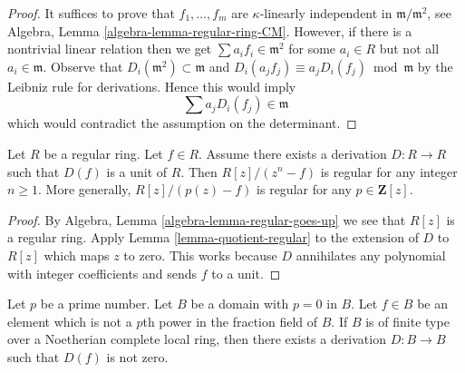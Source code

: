 \begin{proof}
It suffices to prove that $f_1, \ldots, f_m$ are $\kappa$-linearly
independent in $\mathfrak m/\mathfrak m^2$, see
Algebra, Lemma \ref{algebra-lemma-regular-ring-CM}.
However, if there is a nontrivial linear relation then we get
$\sum a_i f_i \in \mathfrak m^2$ for some $a_i \in R$
but not all $a_i \in \mathfrak m$. Observe that
$D_i(\mathfrak m^2) \subset \mathfrak m$ and
$D_i(a_j f_j) \equiv a_j D_i(f_j) \bmod \mathfrak m$
by the Leibniz rule for derivations. Hence
this would imply
$$
\sum a_j D_i(f_j) \in \mathfrak m
$$
which would contradict the assumption on the determinant.
\end{proof}

\begin{lemma}
\label{lemma-degree-p-extension-regular}
Let $R$ be a regular ring. Let $f \in R$.
Assume there exists a derivation $D : R \to R$ such that $D(f)$ is a unit
of $R$. Then $R[z]/(z^n - f)$ is regular for any integer $n \geq 1$.
More generally, $R[z]/(p(z) - f)$ is regular for any $p \in \mathbf{Z}[z]$.
\end{lemma}

\begin{proof}
By Algebra, Lemma \ref{algebra-lemma-regular-goes-up} we see that
$R[z]$ is a regular ring. Apply Lemma \ref{lemma-quotient-regular}
to the extension of $D$ to $R[z]$ which maps $z$ to zero.
This works because $D$ annihilates any polynomial with
integer coefficients and sends $f$ to a unit.
\end{proof}

\begin{lemma}
\label{lemma-find-D}
Let $p$ be a prime number. Let $B$ be a domain with $p = 0$ in $B$.
Let $f \in B$ be an element which is not a $p$th power in the fraction
field of $B$. If $B$ is of finite type over a Noetherian complete
local ring, then there exists a derivation $D : B \to B$ such that $D(f)$
is not zero.
\end{lemma}

